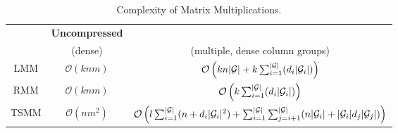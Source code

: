 \begin{table}[!t]
  \centering \setlength\tabcolsep{12.5pt}
	\caption{\label{tab:cost}Complexity of Matrix Multiplications.}
	\vspace{-0.4cm}
	\begin{tabular}{ccc}
		\toprule
		     & \textbf{Uncompressed} & \textbf{\name}                                                                                               \\
		     & (dense)                               & (multiple, dense column groups)                                                                              \\
		\midrule
		LMM  & $\mathcal{O}\left(knm\right)$         & $\mathcal{O}\left(kn\card{\mathcal{G}} + k \sum_{i=1}^{\card{\mathcal{G}}}(d_i \card{\mathcal{G}_i})\right)$ \\
		RMM  & $\mathcal{O}\left(knm\right)$         & $\mathcal{O}\left(k \sum_{i=1}^{\card{\mathcal{G}}}(d_i \card{\mathcal{G}_i})\right)$                        \\
		TSMM & $\mathcal{O}\left(nm^2\right)$        & \hspace{-0.3cm}
		$\mathcal{O}\left(
			 {l} \sum_{i=1}^{\card{\mathcal{G}}}(n + d_i \card{\mathcal{G}_i}^2)+
					\sum_{i=1}^{\card{\mathcal{G}}}\sum_{j=i+1}^{\card{\mathcal{G}}}(n\card{\mathcal{G}_i} + \card{\mathcal{G}_i}d_j \card{\mathcal{G}_j})
				
			\right)$                                                                                                                                                \\
		\bottomrule
	\end{tabular}
\end{table}



